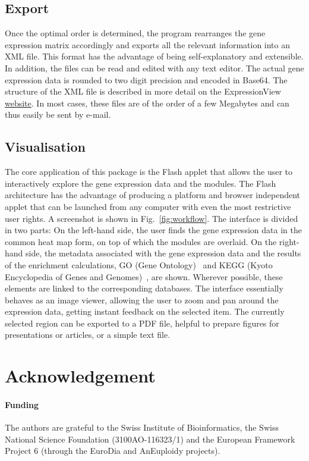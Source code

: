 \documentclass[round]{bioinfo}
\begin{document}
\subsection{Export}
Once the optimal order is determined, the program rearranges the gene
expression matrix accordingly and exports all the relevant information
into an XML file. This format has the advantage of being
self-explanatory and extensible. In addition, the files can be read
and edited with any text editor. The actual gene expression data is
rounded to two digit precision and encoded in Base64. The structure of
the XML file is described in more detail on the ExpressionView
\href{http://www.unil.ch/cbg/ExpressionView}{website}. In most cases,
these files are of the order of a few Megabytes and can thus easily be
sent by e-mail.

\subsection{Visualisation}
The core application of this package is the Flash applet that allows
the user to interactively explore the gene expression data and the
modules. The Flash architecture has the advantage of
producing a platform and browser independent applet that can be
launched from any computer with even the most restrictive user
rights. A screenshot is shown in Fig.~\ref{fig:workflow}. The
interface is divided in two parts: On the left-hand side, the user
finds the gene expression data in the common heat map form, on top of
which the modules are overlaid. On the right-hand side, the metadata
associated with the gene expression data and the results of the
enrichment calculations, GO (Gene Ontology)~\citep{ashburner00} and
KEGG (Kyoto Encyclopedia of Genes and Genomes)~\citep{kanehisa04}, are
shown. Wherever possible, these elements are linked to the
corresponding databases. The interface essentially behaves as an image
viewer, allowing the user to zoom and pan around the expression data,
getting instant feedback on the selected item. The currently selected
region can be exported to a PDF file, helpful to prepare figures for
presentations or articles, or a simple text file.

\section*{Acknowledgement}

\paragraph{Funding\textcolon} The authors are grateful to the Swiss
Institute of Bioinformatics, the Swiss National Science Foundation
(3100AO-116323/1) and the European Framework Project 6 (through
the EuroDia and AnEuploidy projects).
\end{document}
